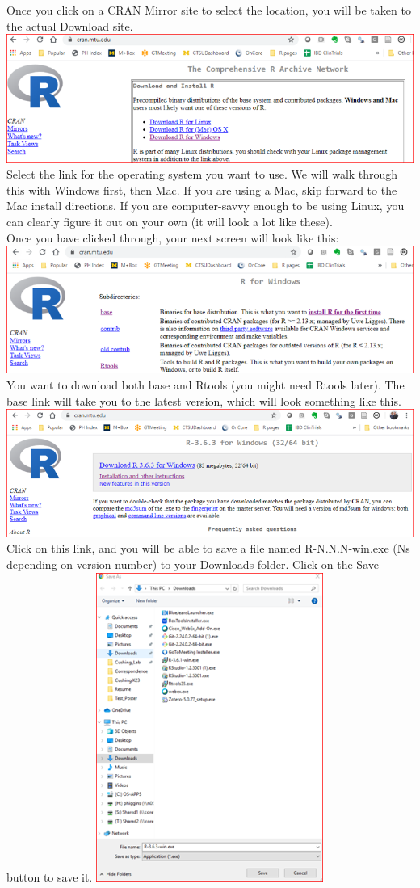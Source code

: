 \documentclass[
]{book}
\begin{document}
Once you click on a CRAN Mirror site to select the location, you will be taken to the actual Download site.
\includegraphics{images/installr.png}
Select the link for the operating system you want to use. We will walk through this with Windows first, then Mac. If you are using a Mac, skip forward to the Mac install directions. If you are computer-savvy enough to be using Linux, you can clearly figure it out on your own (it will look a lot like these).\\
Once you have clicked through, your next screen will look like this:\\
\includegraphics{images/installr2.png}
You want to download both base and Rtools (you might need Rtools later). The base link will take you to the latest version, which will look something like this.
\includegraphics{images/installr3windows.png}
Click on this link, and you will be able to save a file named R-N.N.N-win.exe (Ns depending on version number) to your Downloads folder. Click on the Save button to save it.
\includegraphics{images/installrsave.png}
\end{document}
